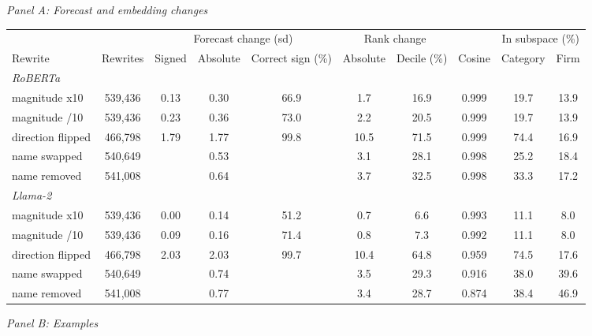 \begin{table}[htbp]
{\footnotesize
\textit{Panel A: Forecast and embedding changes}\\[2pt]
\begin{adjustbox}{max width=\linewidth, max totalheight=0.34\textheight}
\begin{tabular}{lccccccccc}
\toprule
\multicolumn{2}{c}{} & \multicolumn{3}{c}{Forecast change (sd)} & \multicolumn{2}{c}{Rank change} &  & \multicolumn{2}{c}{In subspace (\%)} \\
\cmidrule(lr){3-5} \cmidrule(lr){6-7} \cmidrule(lr){9-10}
Rewrite & Rewrites & Signed & Absolute & Correct sign (\%) & Absolute & Decile (\%) & Cosine & Category & Firm \\
\midrule
\multicolumn{10}{l}{\textit{RoBERTa}} \\
magnitude x10 & 539,436 & 0.13 & 0.30 & 66.9 & \phantom{0}1.7 & 16.9 & 0.999 & 19.7 & 13.9 \\
magnitude /10 & 539,436 & 0.23 & 0.36 & 73.0 & \phantom{0}2.2 & 20.5 & 0.999 & 19.7 & 13.9 \\
direction flipped & 466,798 & 1.79 & 1.77 & 99.8 & 10.5 & 71.5 & 0.999 & 74.4 & 16.9 \\
name swapped & 540,649 &  & 0.53 &  & \phantom{0}3.1 & 28.1 & 0.998 & 25.2 & 18.4 \\
name removed & 541,008 &  & 0.64 &  & \phantom{0}3.7 & 32.5 & 0.998 & 33.3 & 17.2 \\
\midrule
\multicolumn{10}{l}{\textit{Llama-2}} \\
magnitude x10 & 539,436 & 0.00 & 0.14 & 51.2 & \phantom{0}0.7 & \phantom{0}6.6 & 0.993 & 11.1 & \phantom{0}8.0 \\
magnitude /10 & 539,436 & 0.09 & 0.16 & 71.4 & \phantom{0}0.8 & \phantom{0}7.3 & 0.992 & 11.1 & \phantom{0}8.0 \\
direction flipped & 466,798 & 2.03 & 2.03 & 99.7 & 10.4 & 64.8 & 0.959 & 74.5 & 17.6 \\
name swapped & 540,649 &  & 0.74 &  & \phantom{0}3.5 & 29.3 & 0.916 & 38.0 & 39.6 \\
name removed & 541,008 &  & 0.77 &  & \phantom{0}3.4 & 28.7 & 0.874 & 38.4 & 46.9 \\
\bottomrule
\end{tabular}
\end{adjustbox}
\par\medskip
\textit{Panel B: Examples}\\[2pt]
\begin{adjustbox}{max width=\linewidth, max totalheight=0.21\textheight}
\begin{tabular}{lcc}

\end{tabular}
\end{adjustbox}}
\end{table}

